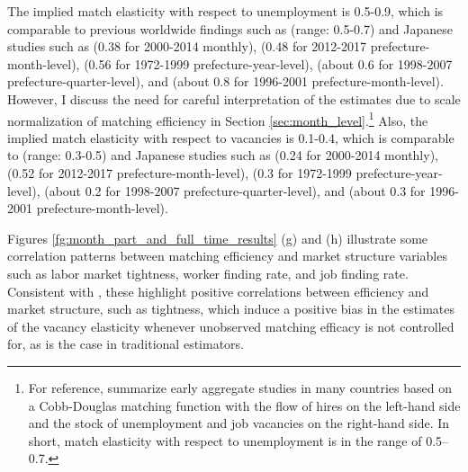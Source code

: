 \documentclass[12pt]{article}
\begin{document}
The implied match elasticity with respect to unemployment is 0.5-0.9, which is comparable to previous worldwide findings such as \cite{petrongolo2001looking} (range: 0.5-0.7) and Japanese studies such as \cite{higashi2018spatial} (0.38 for 2000-2014 monthly), \cite{kawata2019} (0.48 for 2012-2017 prefecture-month-level), \cite{kano2005estimating} (0.56 for 1972-1999 prefecture-year-level), \cite{sasaki2007measuring} (about 0.6 for 1998-2007 prefecture-quarter-level), and \cite{kambayashi2006vacancy} (about 0.8 for 1996-2001 prefecture-month-level). However, I discuss the need for careful interpretation of the estimates due to scale normalization of matching efficiency in Section \ref{sec:month_level}.\footnote{For reference, \cite{petrongolo2001looking} summarize early aggregate studies in many countries based on a Cobb-Douglas matching function with the flow of hires on the left-hand side and the stock of unemployment and job vacancies on the right-hand side. In short, match elasticity with respect to unemployment is in the range of 0.5–0.7.}
Also, the implied match elasticity with respect to vacancies is 0.1-0.4, which is comparable to \cite{lange2020beyond} (range: 0.3-0.5) and Japanese studies such as \cite{higashi2018spatial} (0.24 for 2000-2014 monthly), \cite{kawata2019} (0.52 for 2012-2017 prefecture-month-level), \cite{kano2005estimating} (0.3 for 1972-1999 prefecture-year-level), \cite{sasaki2007measuring} (about 0.2 for 1998-2007 prefecture-quarter-level), and \cite{kambayashi2006vacancy} (about 0.3 for 1996-2001 prefecture-month-level).

Figures \ref{fg:month_part_and_full_time_results} (g) and (h) illustrate some correlation patterns between matching efficiency and market structure variables such as labor market tightness, worker finding rate, and job finding rate. Consistent with \cite{lange2020beyond}, these highlight positive correlations between efficiency and market structure, such as tightness, which induce a positive bias in the estimates of the vacancy elasticity whenever unobserved matching efficacy is not controlled for, as is the case in traditional estimators.
\end{document}
